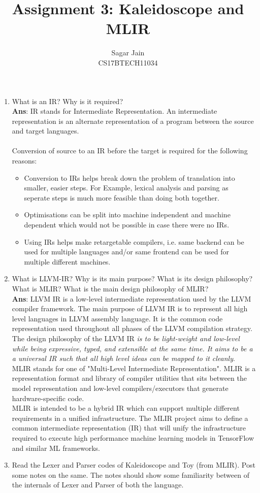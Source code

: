 \documentclass[12pt]{article}
\begin{document}
\title{
Assignment 3: Kaleidoscope and MLIR}
\author{Sagar Jain\\CS17BTECH11034}
\maketitle
\begin{enumerate}
\item What is an IR? Why is it required?\\
\textbf{Ans}: IR stands for Intermediate Representation. An intermediate representation is an alternate representation of a program between the source and target languages.\\\\
Conversion of source to an IR before the target is required for the following reasons:
\begin{itemize}
\item Conversion to IRs helps break down the problem of translation into smaller, easier steps.
For Example, lexical analysis and parsing as seperate steps is much more feasible than doing both together.
\item Optimisations can be split into machine independent and machine dependent which would not be possible in case there were no IRs.
\item Using IRs helps make retargetable compilers, i.e. same backend can be used for multiple languages and/or same frontend can be used for multiple different machines.
\end{itemize}
\item What is LLVM-IR? Why is its main purpose? What is its design philosophy? What is MLIR? What is the main design philosophy of MLIR?\\
\textbf{Ans}: LLVM IR is a low-level intermediate representation used by the LLVM compiler framework. The main purpose of LLVM IR is to represent all high level languages in LLVM assembly language. It is the common code representation used throughout all phases of the LLVM compilation strategy.\\

The design philosophy of the LLVM IR \textit{is to be light-weight and low-level while being expressive, typed, and extensible at the same time. It aims to be a a universal IR such that all high level ideas can be mapped to it cleanly}.\\

MLIR stands for one of "Multi-Level Intermediate Representation". MLIR is a representation format and library of compiler utilities that sits between the model representation and low-level compilers/executors that generate hardware-specific code.\\
MLIR is intended to be a hybrid IR which can support multiple different requirements in a unified infrastructure. 
The MLIR project aims to define a common intermediate representation (IR) that will unify the infrastructure required to execute high performance machine learning models in TensorFlow and similar ML frameworks.
\item Read the Lexer and Parser codes of Kaleidoscope and Toy (from MLIR). Post some notes on the same. The notes should show some familiarity between of the internals of Lexer and Parser of both the language.

\end{enumerate}
\end{document}
